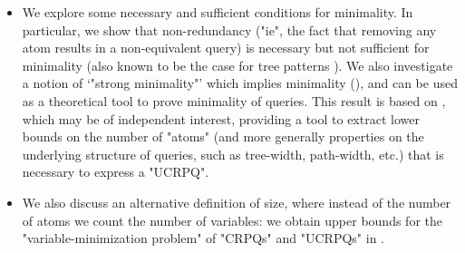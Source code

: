 \begin{itemize}
	\item We explore some necessary and sufficient conditions for minimality. In particular, we show that non-redundancy ("ie", the fact that removing any atom results in a non-equivalent query) is necessary but not sufficient for minimality (also known to be the case for tree patterns \cite{CzerwinskiMartensNiewerthParys2018Minimization}). We also investigate a notion of `"strong minimality"' which implies minimality (), and can be used as a theoretical tool to prove minimality of queries.
	This result is based on , which may be of independent interest, providing a tool to extract
	lower bounds on the number of "atoms" (and more generally properties on the underlying structure of queries, such as tree-width, path-width, etc.) that is necessary to express a "UCRPQ".
	\item We also discuss an alternative definition of size, where instead of the number of atoms we count the number of variables: we obtain upper bounds for the "variable-minimization problem" of "CRPQs" and "UCRPQs" in .
\end{itemize}
	
